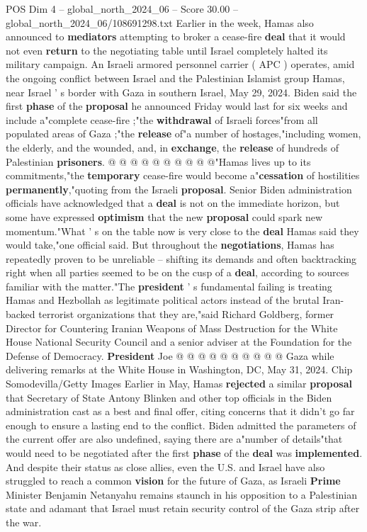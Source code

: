 \begin{textsample}{POS Dim 4 – global\_north\_2024\_06 – Score 30.00 – global\_north\_2024\_06/108691298.txt}
Earlier in the week, Hamas also announced to \textbf{mediators} attempting to broker a cease-fire \textbf{deal} that it would not even \textbf{return} to the negotiating table until Israel completely halted its military campaign.
An Israeli armored personnel carrier ( APC ) operates, amid the ongoing conflict between Israel and the Palestinian Islamist group Hamas, near Israel ' s border with Gaza in southern Israel, May 29, 2024.
Biden said the first \textbf{phase} of the \textbf{proposal} he announced Friday would last for six weeks and include a"complete cease-fire ;"the \textbf{withdrawal} of Israeli forces"from all populated areas of Gaza ;"the \textbf{release} of"a number of hostages,"including women, the elderly, and the wounded, and, in \textbf{exchange}, the \textbf{release} of hundreds of Palestinian \textbf{prisoners}. @ @ @ @ @ @ @ @ @ @"Hamas lives up to its commitments,"the \textbf{temporary} cease-fire would become a"\textbf{cessation} of hostilities \textbf{permanently},"quoting from the Israeli \textbf{proposal}.
Senior Biden administration officials have acknowledged that a \textbf{deal} is not on the immediate horizon, but some have expressed \textbf{optimism} that the new \textbf{proposal} could spark new momentum."What ' s on the table now is very close to the \textbf{deal} Hamas said they would take,"one official said.
But throughout the \textbf{negotiations}, Hamas has repeatedly proven to be unreliable -- shifting its demands and often backtracking right when all parties seemed to be on the cusp of a \textbf{deal}, according to sources familiar with the matter."The \textbf{president} ' s fundamental failing is treating Hamas and Hezbollah as legitimate political actors instead of the brutal Iran-backed terrorist organizations that they are,"said Richard Goldberg, former Director for Countering Iranian Weapons of Mass Destruction for the White House National Security Council and a senior adviser at the Foundation for the Defense of Democracy. \textbf{President} Joe @ @ @ @ @ @ @ @ @ @ Gaza while delivering remarks at the White House in Washington, DC, May 31, 2024.
Chip Somodevilla/Getty Images Earlier in May, Hamas \textbf{rejected} a similar \textbf{proposal} that Secretary of State Antony Blinken and other top officials in the Biden administration cast as a best and final offer, citing concerns that it didn't go far enough to ensure a lasting end to the conflict.
Biden admitted the parameters of the current offer are also undefined, saying there are a"number of details"that would need to be negotiated after the first \textbf{phase} of the \textbf{deal} was \textbf{implemented}.
And despite their status as close allies, even the U.S. and Israel have also struggled to reach a common \textbf{vision} for the future of Gaza, as Israeli \textbf{Prime} Minister Benjamin Netanyahu remains staunch in his opposition to a Palestinian state and adamant that Israel must retain security control of the Gaza strip after the war.


\end{textsample}
